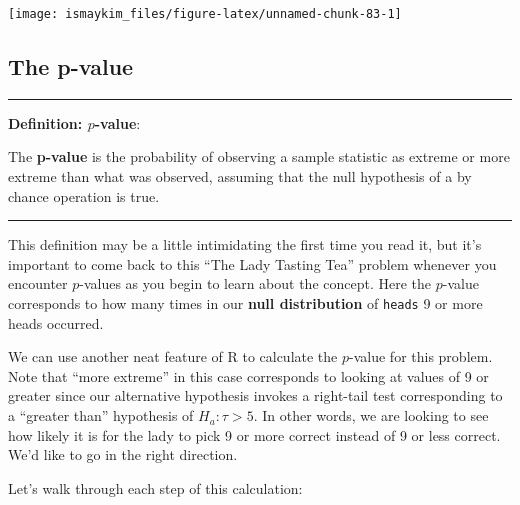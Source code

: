 \documentclass[]{tufte-book}
\newenvironment{Shaded}{\begin{snugshade}}{\end{snugshade}}
\newcommand{\KeywordTok}[1]{\textcolor[rgb]{0.13,0.29,0.53}{\textbf{{#1}}}}
\newcommand{\DecValTok}[1]{\textcolor[rgb]{0.00,0.00,0.81}{{#1}}}
\newcommand{\StringTok}[1]{\textcolor[rgb]{0.31,0.60,0.02}{{#1}}}
\newcommand{\NormalTok}[1]{{#1}}
\let\oldrule=\rule
\renewcommand{\rule}[1]{\oldrule{\linewidth}}
\theoremstyle{definition}
\theoremstyle{definition}
\theoremstyle{remark}
\begin{document}
\begin{center}\texttt{[image: ismaykim\_files/figure-latex/unnamed-chunk-83-1]} \end{center}

\subsection{The p-value}\label{the-p-value}

\begin{center}\rule{0.5\linewidth}{\linethickness}\end{center}

\textbf{Definition: \(p\)-value}:

The \textbf{p-value} is the probability of observing a sample statistic
as extreme or more extreme than what was observed, assuming that the
null hypothesis of a by chance operation is true.

\begin{center}\rule{0.5\linewidth}{\linethickness}\end{center}

This definition may be a little intimidating the first time you read it,
but it's important to come back to this ``The Lady Tasting Tea'' problem
whenever you encounter \(p\)-values as you begin to learn about the
concept. Here the \(p\)-value corresponds to how many times in our
\textbf{null distribution} of \texttt{heads} 9 or more heads occurred.

We can use another neat feature of R to calculate the \(p\)-value for
this problem. Note that ``more extreme'' in this case corresponds to
looking at values of 9 or greater since our alternative hypothesis
invokes a right-tail test corresponding to a ``greater than'' hypothesis
of \(H_a: \tau > 5\). In other words, we are looking to see how likely
it is for the lady to pick 9 or more correct instead of 9 or less
correct. We'd like to go in the right direction.

\begin{Shaded}
\end{Shaded}

Let's walk through each step of this calculation:
\end{document}
